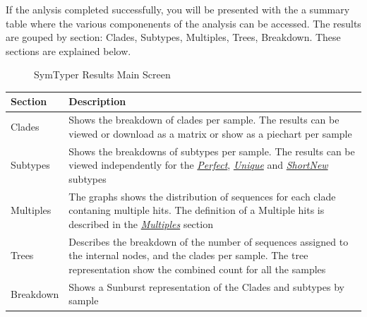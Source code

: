 \documentclass[letterpaper,10pt,english]{sphinxmanual}
\begin{document}
If the anlysis completed successfully, you will be presented with
the a summary table where the various componenents of the analysis
can be accessed. The results are gouped by section: Clades, Subtypes, Multiples, Trees, Breakdown. These sections are explained below.
\begin{figure}[htbp]
\centering
\capstart

\caption{SymTyper Results Main Screen}\label{Web:main-results-page}\end{figure}

\begin{tabulary}{\linewidth}{|p{2cm}|p{13cm}|}
\hline
\textsf{\relax 
Section
} & \textsf{\relax 
Description
}\\
\hline
Clades
 & 
Shows the breakdown of clades per sample. The results can be viewed or download as a matrix or show as a piechart per sample
\\

Subtypes
 & 
Shows the breakdowns of subtypes per sample. The results can be viewed independently for the {\hyperref[defs:perfect]{\emph{Perfect}}}, {\hyperref[defs:unique]{\emph{Unique}}} and  {\hyperref[defs:shortnew]{\emph{ShortNew}}} subtypes
\\

Multiples
 & 
The graphs shows the distribution of sequences for each clade contaning multiple hits. The definition of a Multiple hits is described in the {\hyperref[defs:multiples]{\emph{Multiples}}} section
\\

Trees
 & 
Describes the breakdown of the number of sequences assigned to the internal nodes, and the clades per sample. The tree representation show the combined count for all the samples
\\

Breakdown
 & 
Shows a Sunburst representation of the Clades and subtypes by sample
\\
\hline\end{tabulary}
\end{document}
